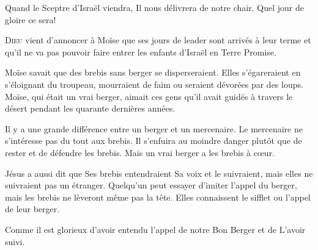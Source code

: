 
Quand le Sceptre d'Israël viendra, Il nous délivrera de notre chair.
 Quel jour de gloire ce sera! 

\dvrule







\lettrine{D}{ieu} vient d'annoncer à Moïse que ses jours de leader
 sont arrivés à leur terme et qu'il ne va pas pouvoir
 faire entrer les enfants d'Israël en Terre Promise.

Moïse savait que des brebis sans berger se disperseraient.
 Elles s'égareraient en s'éloignant du troupeau,
 mourraient de faim ou seraient dévorées par des loups.
 Moïse, qui était un vrai berger,
 aimait ces gens qu'il avait guidés à travers le désert
 pendant les quarante dernières années.

Il y a une grande différence entre un berger et un mercenaire.
 Le mercenaire ne s'intéresse pas du tout aux brebis.
 Il s'enfuira au moindre danger plutôt que de rester et de défendre les brebis.
 Mais un vrai berger a les brebis à c\oe{}ur.


Jésus a aussi dit que Ses brebis entendraient Sa voix et le suivraient,
 mais elles ne suivraient pas un étranger.
 Quelqu'un peut essayer d'imiter l'appel du berger,
 mais les brebis ne lèveront même pas la tête.
 Elles connaissent le sifflet ou l'appel de leur berger.

Comme il est glorieux d'avoir entendu l'appel de notre Bon Berger
 et de L'avoir suivi. 

